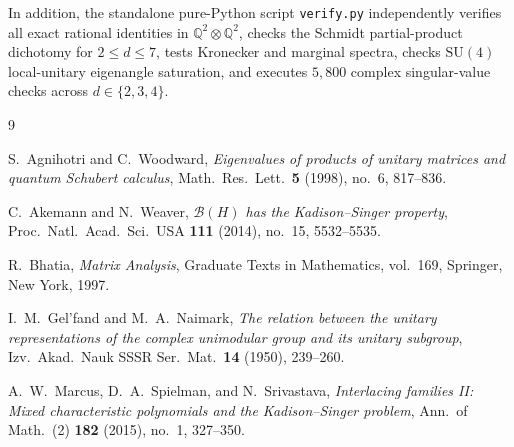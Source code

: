 \documentclass[11pt,a4paper]{article}
\theoremstyle{plain}
\theoremstyle{definition}
\newcommand{\Q}{\mathbb{Q}}
\newcommand{\SU}{\mathrm{SU}}
\begin{document}
In addition, the standalone pure-Python script \texttt{verify.py} independently verifies all exact rational identities in $\Q^2 \otimes \Q^2$, checks the Schmidt partial-product dichotomy for $2 \le d \le 7$, tests Kronecker and marginal spectra, checks $\SU(4)$ local-unitary eigenangle saturation, and executes $5{,}800$ complex singular-value checks across $d \in \{2, 3, 4\}$.

\clearpage
\begin{thebibliography}{9}

S.~Agnihotri and C.~Woodward,
\emph{Eigenvalues of products of unitary matrices and quantum Schubert calculus},
Math.\ Res.\ Lett.\ \textbf{5} (1998), no.~6, 817--836.

C.~Akemann and N.~Weaver,
\emph{$\mathcal{B}(H)$ has the Kadison--Singer property},
Proc.\ Natl.\ Acad.\ Sci.\ USA \textbf{111} (2014), no.~15, 5532--5535.

R.~Bhatia,
\emph{Matrix Analysis},
Graduate Texts in Mathematics, vol.~169, Springer, New York, 1997.

I.~M.~Gel'fand and M.~A.~Naimark,
\emph{The relation between the unitary representations of the complex unimodular group and its unitary subgroup},
Izv.\ Akad.\ Nauk SSSR Ser.\ Mat.\ \textbf{14} (1950), 239--260.

A.~W.~Marcus, D.~A.~Spielman, and N.~Srivastava,
\emph{Interlacing families II: Mixed characteristic polynomials and the Kadison--Singer problem},
Ann.\ of Math.\ (2) \textbf{182} (2015), no.~1, 327--350.

\end{thebibliography}
\end{document}

